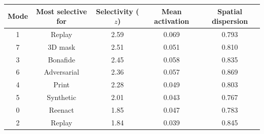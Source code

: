 \begin{tabular}{ccccc}
\toprule
Mode & Most selective for & Selectivity ($z$) & Mean activation & Spatial dispersion \\
\midrule
1 & Replay & 2.59 & 0.069 & 0.793 \\
7 & 3D mask & 2.51 & 0.051 & 0.810 \\
3 & Bonafide & 2.45 & 0.058 & 0.835 \\
6 & Adversarial & 2.36 & 0.057 & 0.869 \\
4 & Print & 2.28 & 0.049 & 0.803 \\
5 & Synthetic & 2.01 & 0.043 & 0.767 \\
0 & Reenact & 1.85 & 0.047 & 0.783 \\
2 & Replay & 1.84 & 0.039 & 0.845 \\
\bottomrule
\end{tabular}